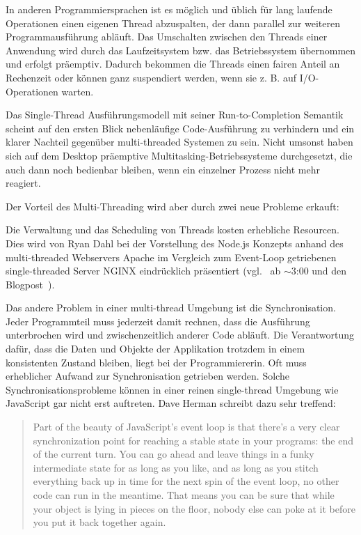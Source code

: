 \documentclass[
11pt, %
a4paper, %
oneside, %
pdfspacing, %
headinclude,
BCOR5mm, %
ngerman, %
bibtotocnumbered,
]{scrartcl}
\begin{document}
		In anderen Programmiersprachen ist es möglich und üblich für lang laufende Operationen einen eigenen Thread abzuspalten, der dann pa\-ral\-lel zur weiteren Programmausführung abläuft. Das Umschalten zwischen den Threads einer Anwendung wird durch das Laufzeitsystem bzw. das Betriebssystem übernommen und erfolgt präemptiv. Dadurch bekommen die Threads einen fairen Anteil an Rechenzeit oder können ganz suspendiert werden, wenn sie z. B. auf I/O-Operationen warten.
		
		Das Single-Thread Ausführungsmodell mit seiner Run-to-Completion Semantik scheint auf den ersten Blick nebenläufige Code-Ausführung zu verhindern und ein klarer Nachteil gegenüber multi-threaded Systemen zu sein. Nicht umsonst haben sich auf dem Desktop präemptive Multitasking-Betriebssysteme durchgesetzt, die auch dann noch bedienbar bleiben, wenn ein einzelner Prozess nicht mehr reagiert.
		
		Der Vorteil des Multi-Threading wird aber durch zwei neue Probleme erkauft: 
		
		Die Verwaltung und das Scheduling von Threads kosten erhebliche Resourcen. Dies wird von Ryan Dahl bei der Vorstellung des Node.js Konzepts anhand des multi-threaded Webservers Apache im Vergleich zum Event-Loop getriebenen single-threaded Server NGINX eindrücklich präsentiert (vgl.~\citep{Dahl.2009} ab $\sim$3:00 und den Blogpost~\citep{Poli.2013}).
		
		Das andere Problem in einer multi-thread Umgebung ist die Synchronisation. Jeder Programmteil muss jederzeit damit rechnen, dass die Ausführung unterbrochen wird und zwischenzeitlich anderer Code abläuft. Die Verantwortung dafür, dass die Daten und Objekte der Applikation trotzdem in einem konsistenten Zustand bleiben, liegt bei der Programmiererin. Oft muss erheblicher Aufwand zur Synchronisation getrieben werden. Solche Synchronisationsprobleme können in einer reinen single-thread Umgebung wie JavaScript gar nicht erst auftreten. Dave Herman schreibt dazu sehr treffend: 
		
		\begin{quote}Part of the beauty of JavaScript's event loop is that there's a very clear synchronization point for reaching a stable state in your programs: the end of the current turn. You can go ahead and leave things in a funky intermediate state for as long as you like, and as long as you stitch everything back up in time for the next spin of the event loop, no other code can run in the meantime. That means you can be sure that while your object is lying in pieces on the floor, nobody else can poke at it before you put it back together again.~\citep{Herman.01.04.2016}
		\end{quote}
		
\end{document}
